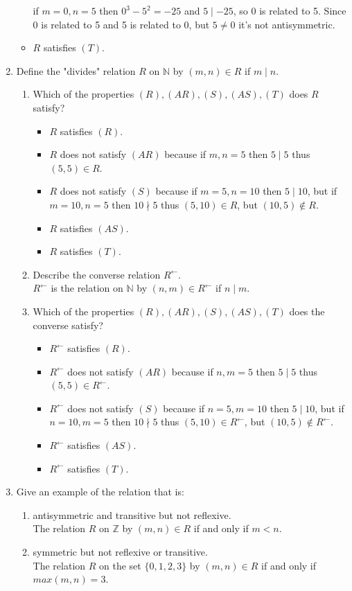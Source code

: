 \documentclass{article}
\newcommand{\N}{\mathbb{N}}
\newcommand{\Z}{\mathbb{Z}}
\begin{document}
\begin{enumerate}
\begin{itemize}
	if $m=0,n=5$ then $0^3-5^2=-25$ and $5\mid-25$, so 0 is related to 5. Since 0 is related to 5 and 5 is 
	related to 0, but $5\not=0$ it's not antisymmetric.
	\item $R$ satisfies $(T)$. 
	\end{itemize}
\item Define the "divides" relation $R$ on $\N$ by $(m,n)\in R$ if $m\mid n$.
	\begin{enumerate}
	\item Which of the properties $(R),(AR),(S),(AS),(T)$ does $R$ satisfy?\\
		\begin{itemize}
		\item $R$ satisfies $(R)$.
		\item $R$ does not satisfy $(AR)$ because if $m,n=5$ then $5\mid5$ thus $(5,5)\in R$.
		\item $R$ does not satisfy $(S)$ because if $m=5,n=10$ then $5\mid10$, but if $m=10,n=5$ then $10\nmid5$ thus 
		$(5,10)\in R$, but $(10,5)\not\in R$.
		\item $R$ satisfies $(AS)$.
		\item $R$ satisfies $(T)$.
		\end{itemize}
	\item Describe the converse relation $R^\gets$.\\
	$R^\gets$ is the relation on $\N$ by $(n,m)\in R^\gets$ if $n\mid m$.
	\item Which of the properties $(R),(AR),(S),(AS),(T)$ does the converse satisfy?\\
		\begin{itemize}
		\item $R^\gets$ satisfies $(R)$.
		\item $R^\gets$ does not satisfy $(AR)$ because if $n,m=5$ then $5\mid5$ thus \\$(5,5)\in R^\gets$.
		\item $R^\gets$ does not satisfy $(S)$ because if $n=5,m=10$ then $5\mid10$, but if $n=10,m=5$ then $10\nmid5$ thus 
		$(5,10)\in R^\gets$, but $(10,5)\not\in R^\gets$.
		\item $R^\gets$ satisfies $(AS)$.
		\item $R^\gets$ satisfies $(T)$.
		\end{itemize}
	\end{enumerate}
\setcounter{enumi}{9}
\item Give an example of the relation that is:
	\begin{enumerate}
	\item antisymmetric and transitive but not reflexive.\\
	The relation $R$ on $\Z$ by $(m,n)\in R$ if and only if $m<n$.
	\item symmetric but not reflexive or transitive.\\
	The relation $R$ on the set $\{0,1,2,3\}$ by $(m,n)\in R$ if and only if $max(m,n)=3$.
	\end{enumerate}
\end{enumerate}
\end{document}
